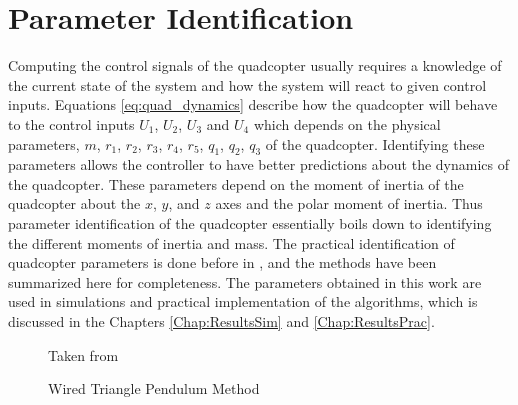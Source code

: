 \documentclass[letterpaper%
, twoside%
, 12pt%
,memoire%
, english%
,creativecommons,hyperref%
]{thETS}
\theoremstyle{newThmStyle}
\begin{document}
\section{Parameter Identification} \label{parameter_identification}
Computing the control signals of the quadcopter usually requires a knowledge of the current state of the system and how the system will react to given control inputs. Equations \eqref{eq:quad_dynamics} describe how the quadcopter will behave to the control inputs $U_1$, $U_2$, $U_3$ and $U_4$ which depends on the physical parameters, $m$, $r_1$, $r_2$, $r_3$, $r_4$, $r_5$, $q_1$, $q_2$, $q_3$ of the quadcopter. Identifying these parameters allows the controller to have better predictions about the dynamics of the quadcopter. These parameters depend on the moment of inertia of the quadcopter about the $x$, $y$, and $z$ axes and the polar moment of inertia. 
Thus parameter identification of the quadcopter essentially boils down to identifying the different moments of inertia and mass. The practical identification of quadcopter parameters is done before in \citep{RN121}, and the methods have been summarized here for completeness. The parameters obtained in this work are used in simulations and practical implementation of the algorithms, which is discussed in the Chapters \ref{Chap:ResultsSim} and \ref{Chap:ResultsPrac}.\\
\begin{figure}
	\centering 
	 \parbox{0.75\textwidth}{
		\begin{center}
		\caption{Wired Triangle Pendulum Method\label{swm_c2}}Taken from \citep{RN121}
		\end{center}	
	} 
\end{figure}
\end{document}
